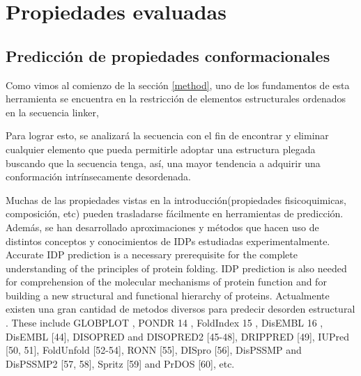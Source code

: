 \chapter{Propiedades evaluadas}
\label{tools}




\section{Predicción de propiedades conformacionales} \label{propiedadesConformacionales}



Como vimos al comienzo de la sección \ref{method}, uno de los fundamentos de esta herramienta se encuentra en la restricción de elementos estructurales ordenados en la secuencia linker, 


Para lograr esto, se analizará la secuencia con el fin de encontrar y eliminar cualquier elemento que pueda permitirle adoptar una estructura plegada
buscando que la secuencia tenga, así, una mayor tendencia a adquirir una conformación intrínsecamente desordenada.



Muchas de las propiedades vistas en la introducción(propiedades fisicoquimicas, composición, etc) pueden trasladarse fácilmente en herramientas de predicción.
Además, se han desarrollado aproximaciones y métodos que hacen uso de distintos conceptos y conocimientos de IDPs estudiadas experimentalmente.
Accurate IDP prediction is a necessary prerequisite for the complete understanding of the principles of protein folding. IDP prediction is also needed for comprehension of the molecular mechanisms of protein function and
for building a new structural and functional hierarchy of proteins.
Actualmente existen una gran cantidad de metodos diversos para predecir desorden estructural \cite{he2009predicting}.
These include GLOBPLOT \cite{linding2003globplot}, PONDR 14 , FoldIndex 15 , DisEMBL 16 ,  DisEMBL [44], DISOPRED and DISOPRED2 [45-48],
DRIPPRED [49], IUPred [50, 51], FoldUnfold [52-54], RONN [55], DISpro [56], DisPSSMP and DisPSSMP2 [57, 58], Spritz [59] and PrDOS [60], etc.

